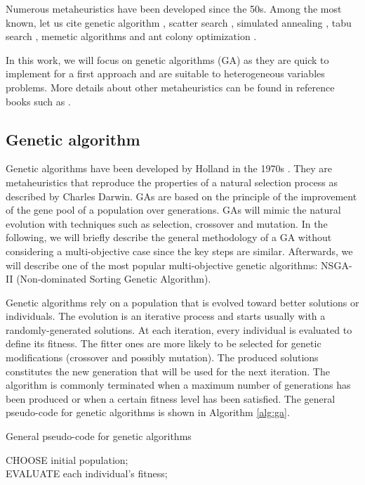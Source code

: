Numerous metaheuristics have been developed since the 50s. Among the most known, let us cite genetic algorithm \cite{holland1975adaptation}, scatter search \cite{Glover77}, simulated annealing \cite{KirkpatrickGelattVecchi83}, tabu search \cite{Glover86}, memetic algorithms \cite{moscato89on} and ant colony optimization \cite{Dor92a.phd}.

In this work, we will focus on genetic algorithms (GA) as they are quick to implement for a first approach and are suitable to heterogeneous variables problems. More details about other metaheuristics can be found in reference books such as \cite{talbi09,dreo06metaheuristics,8125462}.

\subsection{Genetic algorithm}
Genetic algorithms have been developed by Holland in the 1970s \cite{holland1975adaptation}. They are metaheuristics that reproduce the properties of a natural selection process as described by Charles Darwin. GAs are based on the principle of the improvement of the gene pool of a population over generations. GAs will mimic the natural evolution with techniques such as selection, crossover and mutation. In the following, we will briefly describe the general methodology of a GA without considering a multi-objective case since the key steps are similar. Afterwards, we will describe one of the most popular multi-objective genetic algorithms: NSGA-II (Non-dominated Sorting Genetic Algorithm).

Genetic algorithms rely on a population that is evolved toward better solutions or individuals. The evolution is an iterative process and starts usually with a randomly-generated solutions. At each iteration, every individual is evaluated to define its fitness. The fitter ones are more likely to be selected for genetic modifications (crossover and possibly mutation). The produced solutions constitutes the new generation that will be used for the next iteration. The algorithm is commonly terminated when a maximum number of generations has been produced or when a certain fitness level has been satisfied. The general pseudo-code for genetic algorithms is shown in Algorithm \ref{alg:ga}.

\begin{algorithm}[h!]
\caption{General pseudo-code for genetic algorithms}
\label{alg:ga}
CHOOSE initial population;\\
EVALUATE each individual's fitness;\\
\end{algorithm}

